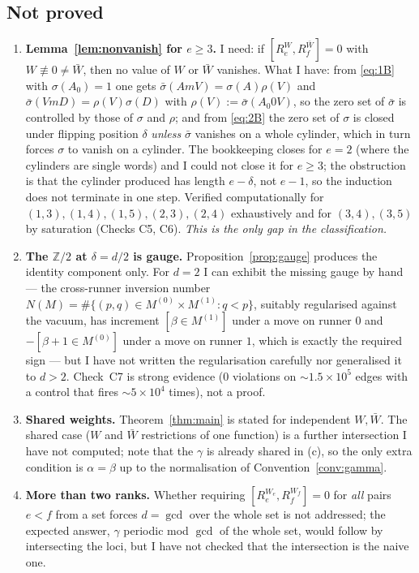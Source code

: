 \documentclass[11pt]{article}
\theoremstyle{definition}
\theoremstyle{remark}
\newcommand{\Z}{\mathbb{Z}}
\begin{document}
\subsection*{Not proved}
\begin{enumerate}
\item[(G1)] \textbf{Lemma~\ref{lem:nonvanish} for $e\ge3$.}  I need: if
  $[R_e^{W},R_f^{\bar W}]=0$ with $W\not\equiv0\ne\bar W$, then no value of $W$ or
  $\bar W$ vanishes.  What I have: from \eqref{eq:1B} with $\sigma(A_0)=1$ one gets
  $\bar\sigma(AmV)=\sigma(A)\rho(V)$ and $\bar\sigma(VmD)=\rho(V)\sigma(D)$ with
  $\rho(V):=\bar\sigma(A_0 0 V)$, so the zero set of $\bar\sigma$ is controlled by those
  of $\sigma$ and $\rho$; and from \eqref{eq:2B} the zero set of $\sigma$ is closed under
  flipping position $\delta$ \emph{unless} $\bar\sigma$ vanishes on a whole cylinder,
  which in turn forces $\sigma$ to vanish on a cylinder.  The bookkeeping closes for
  $e=2$ (where the cylinders are single words) and I could not close it for $e\ge3$; the
  obstruction is that the cylinder produced has length $e-\delta$, not $e-1$, so the
  induction does not terminate in one step.  Verified computationally for
  $(1,3),(1,4),(1,5),(2,3),(2,4)$ exhaustively and for $(3,4),(3,5)$ by saturation
  (Checks C5, C6).  \emph{This is the only gap in the classification.}
\item[(G2)] \textbf{The $\Z/2$ at $\delta=d/2$ is gauge.}  Proposition~\ref{prop:gauge}
  produces the identity component only.  For $d=2$ I can exhibit the missing gauge by
  hand --- the cross-runner inversion number
  $N(M)=\#\{(p,q)\in M^{(0)}\times M^{(1)}: q<p\}$, suitably regularised against the
  vacuum, has increment $[\beta\in M^{(1)}]$ under a move on runner $0$ and
  $-[\beta+1\in M^{(0)}]$ under a move on runner $1$, which is exactly the required
  sign --- but I have not written the regularisation carefully nor generalised it to
  $d>2$.  Check~C7 is strong evidence ($0$ violations on $\sim1.5\times10^5$ edges with a
  control that fires $\sim5\times10^4$ times), not a proof.
\item[(G3)] \textbf{Shared weights.}  Theorem~\ref{thm:main} is stated for independent
  $W,\bar W$.  The shared case ($W$ and $\bar W$ restrictions of one function) is a
  further intersection I have not computed; note that the $\gamma$ is already shared in
  (c), so the only extra condition is $\alpha=\beta$ up to the normalisation of
  Convention~\ref{conv:gamma}.
\item[(G4)] \textbf{More than two ranks.}  Whether requiring
  $[R_e^{W_e},R_f^{W_f}]=0$ for \emph{all} pairs $e<f$ from a set forces
  $d=\gcd$ over the whole set is not addressed; the expected answer, $\gamma$ periodic
  mod $\gcd$ of the whole set, would follow by intersecting the loci, but I have not
  checked that the intersection is the naive one.
\end{enumerate}
\end{document}

